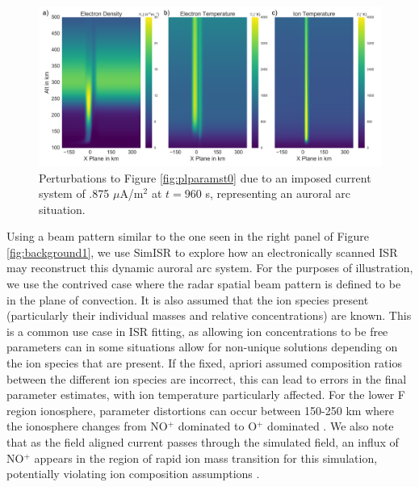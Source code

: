 \documentclass[draft,ras]{agutex}
\begin{document}
\begin{article}
\begin{figure}[!t]
\centering
\includegraphics[width=6in]{0960_15_int}
\caption{Perturbations to Figure \ref{fig:plparamst0} due to an imposed current system of .875 $\mu$A/m$^2$ at $t=960$ s, representing an auroral arc situation.}
\label{fig:plparamst60}
\end{figure}

Using a beam pattern similar to the one seen in the right panel of Figure \ref{fig:background1}, we use SimISR to explore how an electronically scanned ISR may reconstruct this dynamic auroral arc system.  For the purposes of illustration, we use the contrived case where the radar spatial beam pattern is defined to be in the plane of convection.  It is also assumed that the ion species present (particularly their individual masses and relative concentrations) are known. This is a common use case in ISR fitting, as allowing ion concentrations to be free parameters can in some situations allow for non-unique solutions depending on the ion species that are present. If the fixed, apriori assumed composition ratios between the different ion species are incorrect, this can lead to errors in the final parameter estimates, with ion temperature particularly affected. For the lower F region ionosphere, parameter distortions can occur between 150-250 km where the ionosphere changes from NO$^+$ dominated to O$^+$ dominated \citep{Zettergren:2011ej, Blelly:2010gf}. We also note that as the field aligned current passes through the simulated field, an influx of NO$^+$ appears in the region of rapid ion mass transition for this simulation, potentially violating ion composition assumptions \citep{Perry:2015jf}.


\end{article}
\end{document}
